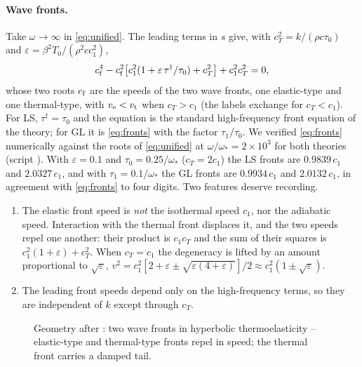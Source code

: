 \paragraph{Wave fronts.} Take $\omega\to\infty$ in \eqref{eq:unified}. The leading terms in $s$ give, with $c_T^2=k/(\rho c\tau_0)$ and $\varepsilon=\beta^2T_0/(\rho^2cc_1^2)$,
\begin{equation}
c_{\rm f}^4-c_{\rm f}^2\bigl[c_1^2(1+\varepsilon\,\tau^\dagger/\tau_0)+c_T^2\bigr]+c_1^2c_T^2=0, \label{eq:fronts}
\end{equation}
whose two roots $c_{\rm f}$ are the speeds of the two wave fronts, one elastic-type and one thermal-type, with $v_{\rm e}<v_{\rm t}$ when $c_T>c_1$ (the labels exchange for $c_T<c_1$). For LS, $\tau^\dagger=\tau_0$ and the equation is the standard high-frequency front equation of the theory; for GL it is \eqref{eq:fronts} with the factor $\tau_1/\tau_0$. We verified \eqref{eq:fronts} numerically against the roots of \eqref{eq:unified} at $\omega/\omega_*=2\times10^3$ for both theories (script ). With $\varepsilon=0.1$ and $\tau_0=0.25/\omega_*$ ($c_T=2c_1$) the LS fronts are $0.9839\,c_1$ and $2.0327\,c_1$, and with $\tau_1=0.1/\omega_*$ the GL fronts are $0.9934\,c_1$ and $2.0132\,c_1$, in agreement with \eqref{eq:fronts} to four digits. Two features deserve recording.
\begin{enumerate}
\item The elastic front speed is \emph{not} the isothermal speed $c_1$, nor the adiabatic speed. Interaction with the thermal front displaces it, and the two speeds repel one another: their product is $c_1c_T$ and the sum of their squares is $c_1^2(1+\varepsilon)+c_T^2$. When $c_T=c_1$ the degeneracy is lifted by an amount proportional to $\sqrt\varepsilon$, $v^2=c_1^2[2+\varepsilon\pm\sqrt{\varepsilon(4+\varepsilon)}]/2\approx c_1^2(1\pm\sqrt\varepsilon)$.
\item The leading front speeds depend only on the high-frequency terms, so they are independent of $k$ except through $c_T$.
\end{enumerate}

\begin{figure}[t!]\centering\small

\caption{Geometry after \citep{Lord1967}: two wave fronts in hyperbolic thermoelasticity -- elastic-type and thermal-type fronts repel in speed; the thermal front carries a damped tail.}\label{fig:fronts}
\end{figure}


